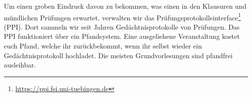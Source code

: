 Um einen groben Eindruck davon zu bekommen, was einen in den Klausuren und mündlichen Prüfungen erwartet, verwalten wir das Pr\"ufungsprotokolleinterface\footnote{\url{https://ppi.fsi.uni-tuebingen.de}} (PPI). Dort sammeln wir seit Jahren Ged\"achtnisprotokolle von Prüfungen. Das PPI funktioniert über ein Pfandsystem. Eine ausgeliehene Veranstaltung kostet euch  Pfand, welche ihr zur\"uckbekommt, wenn ihr selbst wieder ein Gedächtnisprotokoll hochladet. Die meisten Grundvorlesungen sind pfandfrei ausleihbar.